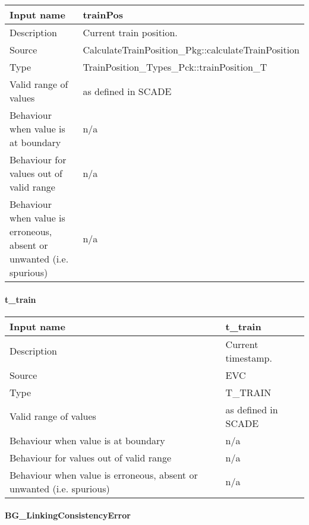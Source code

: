\begin{longtable}{p{}p{}}
\toprule
Input name				& trainPos \\
\midrule
Description				& Current train position. \\
\midrule
Source					& CalculateTrainPosition\_Pkg::calculateTrainPosition \\ 
\midrule
Type					& TrainPosition\_Types\_Pck::trainPosition\_T \\
\midrule
Valid range of values	& as defined in SCADE \\
\midrule
Behaviour when value is at boundary	& n/a \\
\midrule
Behaviour for values out of valid range	& n/a \\
\midrule
Behaviour when value is erroneous, absent or unwanted (i.e. spurious) & n/a \\
\bottomrule
\end{longtable}

\paragraph{t\_train}

\begin{longtable}{p{}p{}}
\toprule
Input name				& t\_train \\
\midrule
Description				& Current timestamp. \\
\midrule
Source					& EVC \\ 
\midrule
Type					& T\_TRAIN \\
\midrule
Valid range of values	& as defined in SCADE \\
\midrule
Behaviour when value is at boundary	& n/a \\
\midrule
Behaviour for values out of valid range	& n/a \\
\midrule
Behaviour when value is erroneous, absent or unwanted (i.e. spurious) & n/a \\
\bottomrule
\end{longtable}

\paragraph{BG\_LinkingConsistencyError}

